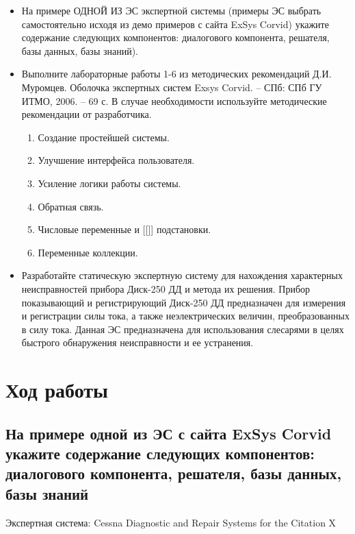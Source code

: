 \documentclass[14pt,a4paper,report]{report}
\begin{document}
\begin{itemize}
	\item На примере ОДНОЙ ИЗ ЭС экспертной системы (примеры ЭС выбрать самостоятельно исходя из демо примеров с сайта ExSys Corvid) укажите содержание следующих компонентов:  диалогового компонента, решателя, базы данных, базы знаний).
	\item Выполните лабораторные работы 1-6 из методических рекомендаций Д.И. Муромцев.
	Оболочка экспертных систем Exsys Corvid. – СПб: СПб ГУ ИТМО, 2006. – 69 с. В случае необходимости используйте методические рекомендации от разработчика.
	\begin{enumerate}
		\item Создание простейшей системы.
		\item Улучшение интерфейса пользователя.
		\item Усиление логики работы системы.
		\item Обратная связь.
		\item Числовые переменные и [[]] подстановки.
		\item Переменные коллекции.
	\end{enumerate}
	\item Разработайте статическую экспертную систему для нахождения характерных неисправностей прибора Диск-250 ДД и метода их решения. Прибор показывающий и регистрирующий Диск-250 ДД предназначен для измерения и регистрации силы тока, а также неэлектрических величин, преобразованных в силу тока. Данная ЭС предназначена для использования слесарями в целях быстрого обнаружения неисправности и ее устранения.
\end{itemize}

\clearpage

\section{Ход работы}

\subsection{На примере одной из ЭС с сайта ExSys Corvid укажите содержание следующих компонентов:  диалогового компонента, решателя, базы данных, базы знаний}

Экспертная система: Cessna Diagnostic and Repair Systems for the Citation X
\end{document}
